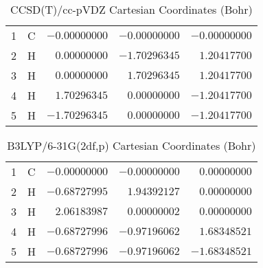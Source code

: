\documentclass[10pt,oneside]{article}
\begin{document}
\begin{table}[h!]
\centering
\caption{CCSD(T)/cc-pVDZ Cartesian Coordinates (Bohr)}
\begin{tabular}{llrrr}
1  & C  & $-0.00000000$ & $-0.00000000$ & $-0.00000000$ \\
2  & H  & $ 0.00000000$ & $-1.70296345$ & $ 1.20417700$ \\
3  & H  & $ 0.00000000$ & $ 1.70296345$ & $ 1.20417700$ \\
4  & H  & $ 1.70296345$ & $ 0.00000000$ & $-1.20417700$ \\
5  & H  & $-1.70296345$ & $ 0.00000000$ & $-1.20417700$ \\
\end{tabular}
\end{table}

\begin{table}[h!]
\centering
\caption{B3LYP/6-31G(2df,p) Cartesian Coordinates (Bohr)}
\begin{tabular}{llrrr}
1  & C  & $-0.00000000$ & $-0.00000000$ & $ 0.00000000$ \\
2  & H  & $-0.68727995$ & $ 1.94392127$ & $ 0.00000000$ \\
3  & H  & $ 2.06183987$ & $ 0.00000002$ & $ 0.00000000$ \\
4  & H  & $-0.68727996$ & $-0.97196062$ & $ 1.68348521$ \\
5  & H  & $-0.68727996$ & $-0.97196062$ & $-1.68348521$ \\
\end{tabular}
\end{table}

\clearpage
\end{document}

